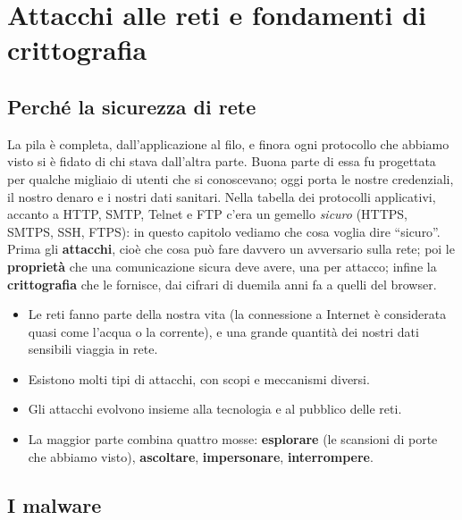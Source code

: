 \chapter{Attacchi alle reti e fondamenti di crittografia}

\section{Perché la sicurezza di rete}

La pila è completa, dall'applicazione al filo, e finora ogni protocollo che abbiamo visto si è fidato di chi stava dall'altra parte.
Buona parte di essa fu progettata per qualche migliaio di utenti che si conoscevano; oggi porta le nostre credenziali, il nostro
denaro e i nostri dati sanitari. Nella tabella dei protocolli applicativi, accanto a HTTP, SMTP, Telnet e FTP c'era un gemello
\emph{sicuro} (HTTPS, SMTPS, SSH, FTPS): in questo capitolo vediamo che cosa voglia dire ``sicuro''. Prima gli \textbf{attacchi}, cioè
che cosa può fare davvero un avversario sulla rete; poi le \textbf{proprietà} che una comunicazione sicura deve avere, una per
attacco; infine la \textbf{crittografia} che le fornisce, dai cifrari di duemila anni fa a quelli del browser.


\begin{itemize}
    \item Le reti fanno parte della nostra vita (la connessione a Internet è considerata quasi come l'acqua o la corrente), e una grande
          quantità dei nostri dati sensibili viaggia in rete.
    \item Esistono molti tipi di attacchi, con scopi e meccanismi diversi.
    \item Gli attacchi evolvono insieme alla tecnologia e al pubblico delle reti.
    \item La maggior parte combina quattro mosse: \textbf{esplorare} (le scansioni di porte che abbiamo visto), \textbf{ascoltare},
          \textbf{impersonare}, \textbf{interrompere}.
\end{itemize}

\section{I malware}

